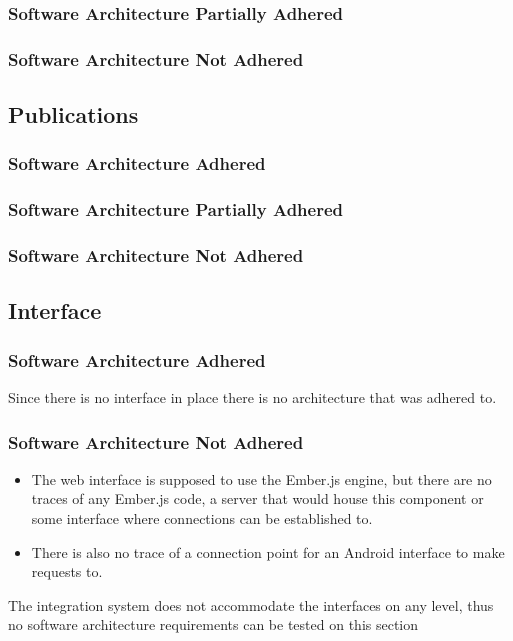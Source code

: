 \documentclass{article}
\begin{document}
        \subsubsection{Software Architecture Partially Adhered}
        \subsubsection{Software Architecture Not Adhered}       
        
    \subsection{Publications}
        \subsubsection{Software Architecture Adhered}
        \subsubsection{Software Architecture Partially Adhered}
        \subsubsection{Software Architecture Not Adhered}       
        
    \subsection{Interface}
        \subsubsection{Software Architecture Adhered}
            Since there is no interface in place there is no architecture that was adhered to.
        \subsubsection{Software Architecture Not Adhered}
            \begin{itemize} 
                \item The web interface is supposed to use the Ember.js engine, but there are no traces of any Ember.js code, a server that would house this component or some interface where connections can be established to.
                \item There is also no trace of a connection point for an Android interface to make requests to.
            \end{itemize}
            The integration system does not accommodate the interfaces on any level, thus no software architecture requirements can be tested on this section
\end{document}

